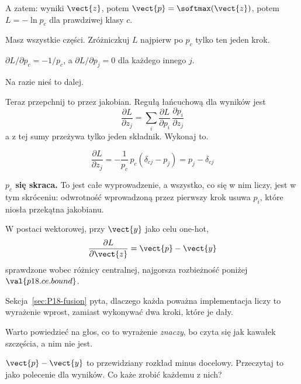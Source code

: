 \begin{fr}
A zatem: wyniki $\vect{z}$, potem $\vect{p} = \softmax(\vect{z})$, potem
$L = -\ln p_c$ dla prawdziwej klasy $c$.

Masz wszystkie części. Zróżniczkuj $L$ najpierw po $p_c$ \dash{} tylko ten
jeden krok.
\nextframe
\end{fr}

\begin{fr}
\begin{ansblock}
$\partial L/\partial p_c = -1/p_c$, a $\partial L / \partial p_j = 0$ dla
każdego innego $j$.
\end{ansblock}

Na razie nieś to dalej.

Teraz przepchnij to przez jakobian. Regułą łańcuchową dla wyników jest
\[ \frac{\partial L}{\partial z_j}
   = \sum_i \frac{\partial L}{\partial p_i}\,
     \frac{\partial p_i}{\partial z_j} \]
a z tej sumy przeżywa tylko jeden składnik. Wykonaj to.
\dotline
\nextframe
\end{fr}

\begin{fr}
\begin{ansblock}
\[ \frac{\partial L}{\partial z_j}
   = -\frac{1}{p_c}\,p_c(\delta_{cj} - p_j) = p_j - \delta_{cj} \]
\end{ansblock}

\textbf{$p_c$ się skraca.} To jest całe wyprowadzenie, a wszystko, co się w
nim liczy, jest w tym skróceniu: odwrotność wprowadzoną przez pierwszy krok
usuwa $p_i$, które niosła przekątna jakobianu.

W postaci wektorowej, przy $\vect{y}$ jako celu one-hot,
\[ \frac{\partial L}{\partial \vect{z}} = \vect{p} - \vect{y} \]
sprawdzone wobec różnicy centralnej, najgorsza rozbieżność poniżej
$\val{p18.ce.bound}$.

Sekcja~\ref{sec:P18-fusion} pyta, dlaczego każda poważna implementacja liczy
to wyrażenie wprost, zamiast wykonywać dwa kroki, które je dały.
\end{fr}

\begin{fr}
Warto powiedzieć na głos, co to wyrażenie \emph{znaczy}, bo czyta się jak
kawałek szczęścia, a nim nie jest.

$\vect{p} - \vect{y}$ to przewidziany rozkład minus docelowy. Przeczytaj to
jako polecenie dla wyników. Co każe zrobić każdemu z nich?
\dotline
\nextframe
\end{fr}

